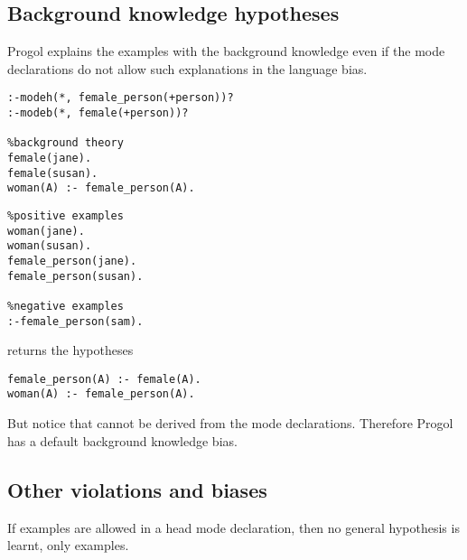 \subsection{Background knowledge hypotheses}
Progol explains the examples with the background knowledge even if the mode declarations do not allow such explanations in the language bias.

\begin{minipage}[t]{.60\textwidth}
\begin{lstlisting}
:-modeh(*, female_person(+person))?
:-modeb(*, female(+person))?

%background theory
female(jane).
female(susan).
woman(A) :- female_person(A).
\end{lstlisting}
\end{minipage}
\begin{minipage}[t]{.20\textwidth}
\begin{lstlisting}
%positive examples
woman(jane).
woman(susan).
female_person(jane).
female_person(susan).

%negative examples
:-female_person(sam).
\end{lstlisting}
\end{minipage}

returns the hypotheses
\begin{lstlisting}
female_person(A) :- female(A).
woman(A) :- female_person(A).
\end{lstlisting}
But notice that  cannot be derived from the mode declarations. Therefore Progol has a default background knowledge bias.

\subsection{Other violations and biases}
If examples are allowed in a head mode declaration, then no general hypothesis is learnt, only examples.
